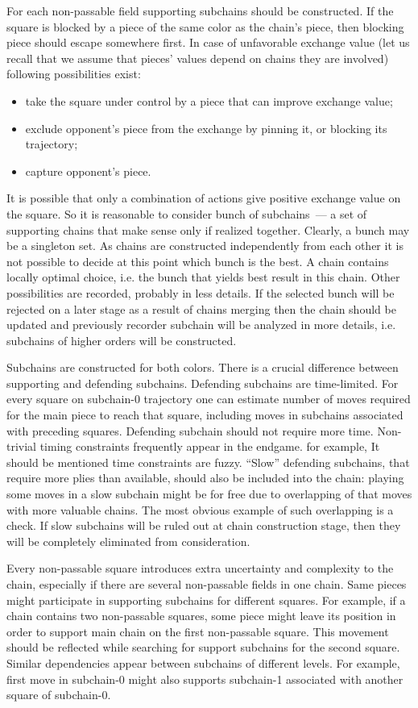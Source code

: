 \documentclass{llncs}
\begin{document}
For each non-passable field supporting subchains should be
constructed. If the square is blocked by a piece of the same color as
the chain's piece, then blocking piece should escape somewhere
first. In case of unfavorable exchange value (let us recall that we
assume that pieces' values depend on chains they are involved)
following possibilities exist:
\begin{itemize}
\item take the square under control by a piece that can improve exchange value;
\item exclude opponent's piece from the exchange by pinning it, or blocking its trajectory;
\item capture opponent's piece.
\end{itemize}
It is possible that only a combination of actions give positive
exchange value on the square. So it is reasonable to consider bunch of
subchains~--- a set of supporting chains that make sense only if
realized together. Clearly, a bunch may be a singleton set. As chains
are constructed independently from each other it is not possible to
decide at this point which bunch is the best. A chain contains locally
optimal choice, i.e. the bunch that yields best result in this
chain. Other possibilities are recorded, probably in less details. If
the selected bunch will be rejected on a later stage as a result of
chains merging then the chain should be updated and previously
recorder subchain will be analyzed in more details, i.e. subchains of
higher orders will be constructed.

Subchains are constructed for both colors. There is a crucial
difference between supporting and defending subchains. Defending
subchains are time-limited. For every square on subchain-0 trajectory
one can estimate number of moves required for the main piece to reach that
square, including moves in subchains associated with preceding
squares. Defending subchain should not require more time. Non-trivial
timing constraints frequently appear in the endgame.  for example, It
should be mentioned time constraints are fuzzy. ``Slow'' defending
subchains, that require more plies than available, should also be
included into the chain: playing some moves in a slow subchain might
be for free due to overlapping of that moves with more valuable
chains. The most obvious example of such overlapping is a check. If
slow subchains will be ruled out at chain construction stage, then they
will be completely eliminated from consideration.

Every non-passable square introduces extra uncertainty and complexity
to the chain, especially if there are several non-passable fields in
one chain. Same pieces might participate in supporting subchains for
different squares. For example, if a chain contains two non-passable
squares, some piece might leave its position in order to support main
chain on the first non-passable square. This movement should be
reflected while searching for support subchains for the second
square. Similar dependencies appear between subchains of different
levels. For example, first move in subchain-0 might also supports
subchain-1 associated with another square of subchain-0.
\end{document}
